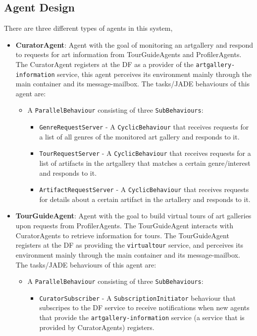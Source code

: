 \documentclass[a4paper, 11pt]{article}
\begin{document}
\subsection*{Agent Design}
There are three different types of agents in this system,
\begin{itemize}
\item \textbf{CuratorAgent}: Agent with the goal of monitoring an artgallery and respond to requests for art information from TourGuideAgents and ProfilerAgents. The CuratorAgent registers at the DF as a provider of the \texttt{artgallery-information} service, this agent perceives its environment mainly through the main container and its message-mailbox. The tasks/JADE behaviours of this agent are:
\begin{itemize}
\item A \texttt{ParallelBehaviour} consisting of three \texttt{SubBehaviours}:
\begin{itemize}
\item \texttt{GenreRequestServer} - A \texttt{CyclicBehaviour} that receives requests for a list of all genres of the monitored art gallery and responds to it.
\item \texttt{TourRequestServer} - A \texttt{CyclicBehaviour} that receives requests for a list of artifacts in the artgallery that matches a certain genre/interest and responds to it.
\item \texttt{ArtifactRequestServer} - A \texttt{CyclicBehaviour} that receives requests for details about a certain artifact in the artallery and responds to it.
\end{itemize}
\end{itemize}
\item \textbf{TourGuideAgent}: Agent with the goal to build virtual tours of art galleries upon requests from ProfilerAgents. The TourGuideAgent interacts with CuratorAgents to retrieve information for tours. The TourGuideAgent registers at the DF as providing the \texttt{virtualtour} service, and perceives its environment mainly through the main container and its message-mailbox. The tasks/JADE behaviours of this agent are:
\begin{itemize}
\item A \texttt{ParallelBehaviour} consisting of three \texttt{SubBehaviours}:
\begin{itemize}
\item \texttt{CuratorSubscriber} - A \texttt{SubscriptionInitiator} behaviour that subscripes to the DF service to receive notifications when new agents that provide the \texttt{artgallery-information} service (a service that is provided by CuratorAgents) registers.

\end{itemize}
\end{itemize}
\end{itemize}
\end{document}
